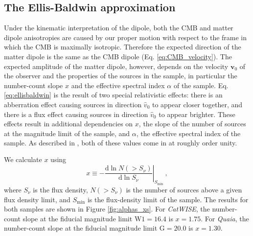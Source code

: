 \documentclass[modern]{aastex631}
\newcommand{\catwise}{\textsl{CatWISE}\xspace}
\newcommand{\quaia}{\textsl{Quaia}\xspace}
\newcommand{\vobs}{\boldsymbol{v}_0}
\newcommand{\dd}{\mathrm{d}}
\newcommand{\w}{\mathrm{W}}
\newcommand{\g}{\mathrm{G}}
\begin{document}
\subsection{The Ellis-Baldwin approximation}
\label{sec:EB}
Under the kinematic interpretation of the dipole, both the CMB and matter dipole anisotropies are caused by our proper motion with respect to the frame in which the CMB is maximally isotropic.
Therefore the expected direction of the matter dipole is the same as the CMB dipole (Eq. \ref{eq:CMB_velocity}).
The expected amplitude of the matter dipole, however, depends on the velocity $\vobs$ of the observer and the properties of the sources in the sample, in particular the number-count slope $x$ and the effective spectral index $\alpha$ of the sample.
Eq. \ref{eq:ellisbaldwin} is the result of two special relativistic effects: there is an abberration effect causing sources in direction $\hat{v}_0$ to appear closer together, and there is a flux effect causing sources in direction $\hat{v}_0$ to appear brighter.
These effects result in additional dependencies on $x$, the slope of the number of sources at the magnitude limit of the sample, and $\alpha$, the effective spectral index of the sample.
As described in \citet{ellis_expected_1984}, both of these values come in at roughly order unity.

We calculate $x$ using
\begin{equation}
    x \equiv -\left.\frac{\dd\ln N(>S_\nu)}{\dd\ln S_\nu}\right|_{S_\mathrm{min}} ~,
\end{equation}
where $S_\nu$ is the flux density, $N(>S_\nu)$ is the number of sources above a given flux density limit, and $S_\mathrm{min}$ is the flux-density limit of the sample.
The results for both samples are shown in Figure \ref{fig:alphas_xs}.
For \catwise, the number-count slope at the fiducial magnitude limit $\w 1=16.4$ is $x=1.75$.
For \quaia, the number-count slope at the fiducial magnitude limit $\g =20.0$ is $x=1.30$.
\end{document}
